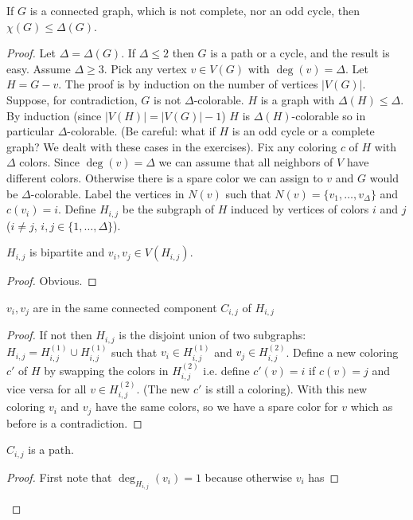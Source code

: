 \begin{theorem}[Brooks]
If $G$ is a connected graph, which is not complete, nor an odd cycle,
then $\chi(G) \le \Delta(G)$.
\end{theorem}
\begin{proof}
Let $\Delta = \Delta(G)$. If $\Delta \le 2$ then $G$ is a path or a
cycle, and the result is easy. Assume $\Delta \ge 3$. Pick any vertex $v
\in V(G)$ with $\deg(v) = \Delta$. Let $H = G-v$.  The proof is by
induction on the number of vertices $|V(G)|$. Suppose, for
contradiction, $G$ is not $\Delta$-colorable. $H$ is a graph with
$\Delta(H) \le \Delta$. By induction (since $|V(H)| = |V(G)| - 1$) $H$
is $\Delta(H)$-colorable so in particular $\Delta$-colorable. (Be
careful: what if $H$ is an odd cycle or a complete graph? We dealt with these cases in the exercises). Fix any
coloring $c$ of $H$ with $\Delta$ colors. Since $\deg(v) = \Delta$ we can
assume that all neighbors of $V$ have different colors. Otherwise there is a
spare color we can assign to $v$ and $G$ would be $\Delta$-colorable.
Label the vertices in $N(v)$ such that $N(v) =
\{v_1,\ldots,v_{\Delta}\}$ and $c(v_i) = i$. Define $H_{i,j}$ be the
subgraph of $H$ induced by vertices of colors $i$ and $j$ ($i \neq j$,
$i,j \in \{1,\ldots,\Delta\}$).
\begin{claim}[0]
$H_{i,j}$ is bipartite and $v_i,v_j \in V(H_{i,j})$.
\end{claim}
\begin{proof}
Obvious.
\end{proof}
\begin{claim}[1]
$v_i,v_j$ are in the same connected component $C_{i,j}$ of $H_{i,j}$
\end{claim}
\begin{proof}
If not then $H_{i,j}$ is the disjoint union of two subgraphs: $H_{i,j} =
H_{i,j}^{(1)} \cup H_{i,j}^{(1)}$ such that $v_i \in
H_{i,j}^{(1)}$ and $v_j \in H_{i,j}^{(2)}$. Define a new coloring $c'$ of $H$
by swapping the colors in $H_{i,j}^{(2)}$ i.e. define $c'(v) = i$ if $c(v) = j$
and vice versa for all $v \in H_{i,j}^{(2)}$. (The new $c'$ is still a
coloring). With this new coloring $v_i$ and $v_j$ have the same colors,
so we have a spare color for $v$ which as before is a contradiction.
\end{proof}
\begin{claim}[2]
$C_{i,j}$ is a path.
\end{claim}
\begin{proof}
First note that $\deg_{H_{i,j}}(v_i) = 1$ because otherwise $v_i$ has

\end{proof}
\end{proof}
